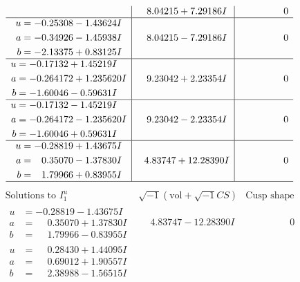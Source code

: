\documentclass[1p]{elsarticle_modified}
\theoremstyle{definition}
\newcommand{\I}{\sqrt{-1}}
\begin{document}
$$\begin{array}{c|c|c}
 & \phantom{-}8.04215 + 7.29186 I & \phantom{-0.000000 } 0 \\ \hline\begin{aligned}
u &= -0.25308 - 1.43624 I \\
a &= -0.34926 - 1.45938 I \\
b &= -2.13375 + 0.83125 I\end{aligned}
 & \phantom{-}8.04215 - 7.29186 I & \phantom{-0.000000 } 0 \\ \hline\begin{aligned}
u &= -0.17132 + 1.45219 I \\
a &= -0.264172 + 1.235620 I \\
b &= -1.60046 - 0.59631 I\end{aligned}
 & \phantom{-}9.23042 + 2.23354 I & \phantom{-0.000000 } 0 \\ \hline\begin{aligned}
u &= -0.17132 - 1.45219 I \\
a &= -0.264172 - 1.235620 I \\
b &= -1.60046 + 0.59631 I\end{aligned}
 & \phantom{-}9.23042 - 2.23354 I & \phantom{-0.000000 } 0 \\ \hline\begin{aligned}
u &= -0.28819 + 1.43675 I \\
a &= \phantom{-}0.35070 - 1.37830 I \\
b &= \phantom{-}1.79966 + 0.83955 I\end{aligned}
 & \phantom{-}4.83747 + 12.28390 I & \phantom{-0.000000 } 0\\
 \hline 
 \end{array}$$\newpage$$\begin{array}{c|c|c}  
\text{Solutions to }I^u_{1}& \I (\text{vol} + \sqrt{-1}CS) & \text{Cusp shape}\\
 \hline 
\begin{aligned}
u &= -0.28819 - 1.43675 I \\
a &= \phantom{-}0.35070 + 1.37830 I \\
b &= \phantom{-}1.79966 - 0.83955 I\end{aligned}
 & \phantom{-}4.83747 - 12.28390 I & \phantom{-0.000000 } 0 \\ \hline\begin{aligned}
u &= \phantom{-}0.28430 + 1.44095 I \\
a &= \phantom{-}0.69012 + 1.90557 I \\
b &= \phantom{-}2.38988 - 1.56515 I\end{aligned}

\end{array}$$
\end{document}
